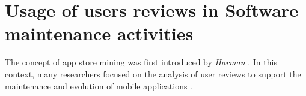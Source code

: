 \section{Usage of users reviews in Software maintenance activities}
The concept of app store mining was first introduced by \textit{Harman} \etal
\cite{appstoremining}. In this context, many researchers focused on the analysis of user reviews to support the maintenance and evolution of mobile applications \cite{Martin:tse2017}.



